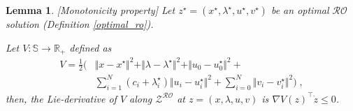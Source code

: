\documentclass[journal,twoside,web]{ieeecolor}
\newtheorem{lemma}{Lemma}
\begin{document}
\begin{lemma} \label{monotonicity} [Monotonicity property]
Let $z^\star=(x^\star,\lambda^\star,u^\star, v^\star)$ be an optimal $\mathcal{RO}$ solution (Definition \ref{optimal_ro}).

 Let  $V: {\mathbb S}\to \mathbb{R}_+ $ defined as
\begin{align}
V=\frac{1}{2}\big( &\Vert x-x^\star\Vert^2+\Vert\lambda-\lambda^\star \Vert^2+\Vert u_0-u_0^\star\Vert^2+\nonumber \\
&\sum_{i=1}^N(c_i+\lambda_i^\star) \Vert u_i-u_i^\star\Vert^2+ \sum_{i=0}^N\Vert v_i-v_i^\star\Vert^2\big)\;, \label{Lya_function}
\end{align}
then, the Lie-derivative of $V$ along $\mathcal{Z}^{\mathcal{RO}}$ at $z=(x,\lambda,u,v)$ is $\nabla V(z)^\top \dot z\leq 0$.
\end{lemma}
\end{document}
